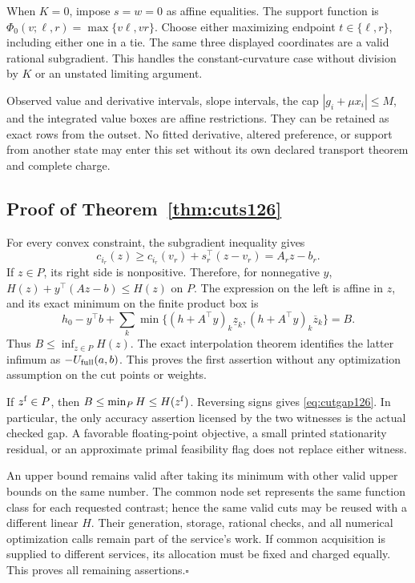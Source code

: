 When $K=0$, impose $s=w=0$ as affine equalities. The support
function is $\Phi_0(v;\ell,r)=\max\{v\ell,vr\}$.
Choose either maximizing endpoint $t\in\{\ell,r\}$, including
either one in a tie. The same three displayed coordinates are a valid
rational subgradient. This handles the constant-curvature case
without division by $K$ or an unstated limiting argument.

Observed value and derivative intervals, slope intervals, the cap
$|g_i+\mu x_i|\le M$, and the integrated value boxes are affine
restrictions. They can be retained as exact rows from the outset.
No fitted derivative, altered preference, or support from another
state may enter this set without its own declared transport theorem
and complete charge.

\subsection{Proof of Theorem~\ref{thm:cuts126}}

For every convex constraint, the subgradient inequality gives
\[
 c_{i_r}(z)\ge c_{i_r}(v_r)+s_r^\top(z-v_r)
                  =A_rz-b_r.
\]
If $z\in P$, its right side is nonpositive. Therefore, for
nonnegative $y$, $H(z)+y^\top(Az-b)\le H(z)$ on $P$.
The expression on the left is affine in $z$, and its exact minimum
on the finite product box is
\[
 h_0-y^\top b+\sum_k
       \min\{(h+A^\top y)_k\underline z_k,
              (h+A^\top y)_k\overline z_k\}=B.
\]
Thus $B\le\inf_{z\in P}H(z)$. The exact interpolation theorem
identifies the latter infimum as $-U_{\rm full}(a,b)$. This proves
the first assertion without any optimization assumption on the cut
points or weights.

If $z^{\rm f}\in P$, then
$B\le\min_PH\le H(z^{\rm f})$. Reversing signs gives
\eqref{eq:cutgap126}. In particular, the only accuracy assertion
licensed by the two witnesses is the actual checked gap. A favorable
floating-point objective, a small printed stationarity residual, or
an approximate primal feasibility flag does not replace either witness.

An upper bound remains valid after taking its minimum with other
valid upper bounds on the same number. The common node set represents
the same function class for each requested contrast; hence the same
valid cuts may be reused with a different linear $H$. Their generation,
storage, rational checks, and all numerical optimization calls remain
part of the service's work. If common acquisition is supplied to
different services, its allocation must be fixed and charged equally.
This proves all remaining assertions.\hfill$\square$

